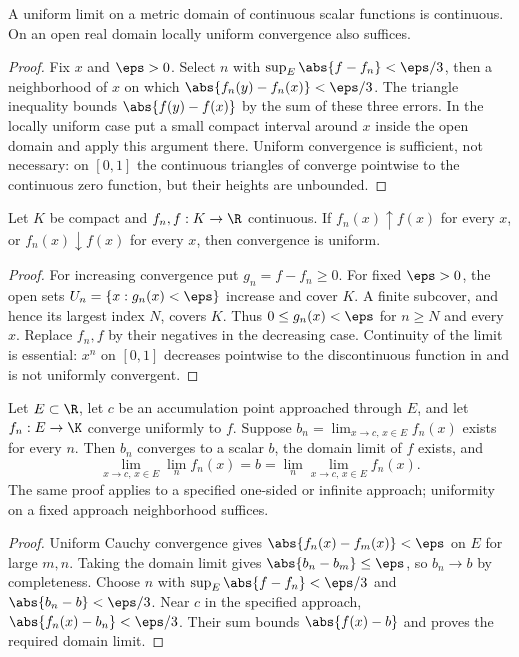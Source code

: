 \begin{theorem}
A uniform limit on a metric domain of continuous scalar functions is continuous. On an open real domain locally uniform convergence also suffices.
\end{theorem}
\begin{proof}
Fix $x$ and $\eps>0$. Select $n$ with $\sup_E\abs{f-f_n}<\eps/3$, then a neighborhood of $x$ on which $\abs{f_n(y)-f_n(x)}<\eps/3$. The triangle inequality bounds $\abs{f(y)-f(x)}$ by the sum of these three errors. In the locally uniform case put a small compact interval around $x$ inside the open domain and apply this argument there. Uniform convergence is sufficient, not necessary: on $[0,1]$ the continuous triangles of  converge pointwise to the continuous zero function, but their heights are unbounded.
\end{proof}

\begin{theorem}
Let $K$ be compact and $f_n,f:K\to\R$ continuous. If $f_n(x)\uparrow f(x)$ for every $x$, or $f_n(x)\downarrow f(x)$ for every $x$, then convergence is uniform.
\end{theorem}
\begin{proof}
For increasing convergence put $g_n=f-f_n\geq0$. For fixed $\eps>0$, the open sets $U_n=\{x:g_n(x)<\eps\}$ increase and cover $K$. A finite subcover, and hence its largest index $N$, covers $K$. Thus $0\leq g_n(x)<\eps$ for $n\geq N$ and every $x$. Replace $f_n,f$ by their negatives in the decreasing case. Continuity of the limit is essential: $x^n$ on $[0,1]$ decreases pointwise to the discontinuous function in  and is not uniformly convergent.
\end{proof}

\begin{theorem}
Let $E\subset\R$, let $c$ be an accumulation point approached through $E$, and let $f_n:E\to\K$ converge uniformly to $f$. Suppose $b_n=\lim_{x\to c,\,x\in E}f_n(x)$ exists for every $n$. Then $b_n$ converges to a scalar $b$, the domain limit of $f$ exists, and
\[\lim_{x\to c,\,x\in E}\lim_n f_n(x)=b=\lim_n\lim_{x\to c,\,x\in E}f_n(x).\]
The same proof applies to a specified one-sided or infinite approach; uniformity on a fixed approach neighborhood suffices.
\end{theorem}
\begin{proof}
Uniform Cauchy convergence gives $\abs{f_n(x)-f_m(x)}<\eps$ on $E$ for large $m,n$. Taking the domain limit gives $\abs{b_n-b_m}\leq\eps$, so $b_n\to b$ by completeness. Choose $n$ with $\sup_E\abs{f-f_n}<\eps/3$ and $\abs{b_n-b}<\eps/3$. Near $c$ in the specified approach, $\abs{f_n(x)-b_n}<\eps/3$. Their sum bounds $\abs{f(x)-b}$ and proves the required domain limit.
\end{proof}

